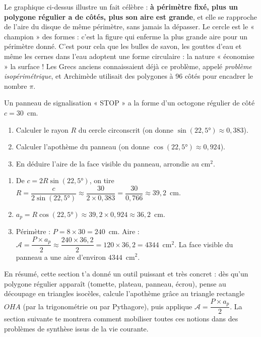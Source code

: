 \documentclass[11pt]{article}
\begin{document}
\begin{savaistu}
Le graphique ci-dessus illustre un fait célèbre : \textbf{à périmètre fixé, plus un polygone régulier a de côtés, plus son aire est grande}, et elle se rapproche de l'aire du disque de même périmètre, sans jamais la dépasser. Le cercle est le « champion » des formes : c'est la figure qui enferme la plus grande aire pour un périmètre donné. C'est pour cela que les bulles de savon, les gouttes d'eau et même les cernes dans l'eau adoptent une forme circulaire : la nature « économise » la surface ! Les Grecs anciens connaissaient déjà ce problème, appelé \emph{problème isopérimétrique}, et Archimède utilisait des polygones à 96 côtés pour encadrer le nombre $\pi$.
\end{savaistu}

\begin{exercice}
Un panneau de signalisation « STOP » a la forme d'un octogone régulier de côté $c = 30$~cm.
\begin{enumerate}
\item Calculer le rayon $R$ du cercle circonscrit (on donne $\sin(22{,}5°) \approx 0{,}383$).
\item Calculer l'apothème du panneau (on donne $\cos(22{,}5°) \approx 0{,}924$).
\item En déduire l'aire de la face visible du panneau, arrondie au cm$^2$.
\end{enumerate}
\end{exercice}

\begin{corrige}
\begin{enumerate}
\item De $c = 2R\sin(22{,}5°)$, on tire $R = \dfrac{c}{2\sin(22{,}5°)} \approx \dfrac{30}{2 \times 0{,}383} = \dfrac{30}{0{,}766} \approx 39{,}2$~cm.
\item $a_p = R\cos(22{,}5°) \approx 39{,}2 \times 0{,}924 \approx 36{,}2$~cm.
\item Périmètre : $P = 8 \times 30 = 240$~cm. Aire : $\mathcal{A} = \dfrac{P \times a_p}{2} \approx \dfrac{240 \times 36{,}2}{2} = 120 \times 36{,}2 = 4344$~cm$^2$. La face visible du panneau a une aire d'environ $4344$~cm$^2$.
\end{enumerate}
\end{corrige}

En résumé, cette section t'a donné un outil puissant et très concret : dès qu'un polygone régulier apparaît (tomette, plateau, panneau, écrou), pense au découpage en triangles isocèles, calcule l'apothème grâce au triangle rectangle $OHA$ (par la trigonométrie ou par Pythagore), puis applique $\mathcal{A} = \dfrac{P \times a_p}{2}$. La section suivante te montrera comment mobiliser toutes ces notions dans des problèmes de synthèse issus de la vie courante.
\end{document}
